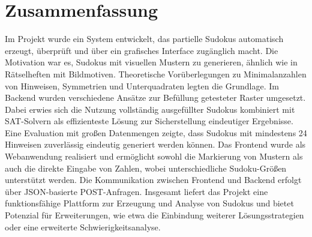 \documentclass[12pt,a4paper]{article}
\begin{document}
\section*{Zusammenfassung}
Im Projekt wurde ein System entwickelt, das partielle Sudokus automatisch erzeugt, überprüft und über ein grafisches Interface zugänglich macht.
Die Motivation war es, Sudokus mit visuellen Mustern zu generieren, ähnlich wie in Rätselheften mit Bildmotiven.
Theoretische Vorüberlegungen zu Minimalanzahlen von Hinweisen, Symmetrien und Unterquadraten legten die Grundlage.
Im Backend wurden verschiedene Ansätze zur Befüllung getesteter Raster umgesetzt.
Dabei erwies sich die Nutzung vollständig ausgefüllter Sudokus kombiniert mit SAT-Solvern als effizienteste Lösung zur Sicherstellung eindeutiger Ergebnisse.
Eine Evaluation mit großen Datenmengen zeigte, dass Sudokus mit mindestens 24 Hinweisen zuverlässig eindeutig generiert werden können.
Das Frontend wurde als Webanwendung realisiert und ermöglicht sowohl die Markierung von Mustern als auch die direkte Eingabe von Zahlen, wobei unterschiedliche Sudoku-Größen unterstützt werden.
Die Kommunikation zwischen Frontend und Backend erfolgt über JSON-basierte POST-Anfragen.
Insgesamt liefert das Projekt eine funktionsfähige Plattform zur Erzeugung und Analyse von Sudokus und bietet Potenzial für Erweiterungen,
wie etwa die Einbindung weiterer Lösungsstrategien oder eine erweiterte Schwierigkeitsanalyse.





\end{document}
